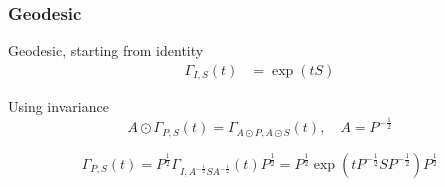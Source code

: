 \documentclass{beamer}
\begin{document}

\begin{frame}
\frametitle{Geodesic}

\begin{block}{Geodesic, starting from identity}
	\begin{align*}
			\Gamma_{I,S}(t) &= \exp(tS)
	\end{align*}
\end{block}

\begin{block}{ }
	Using invariance
	\begin{equation*}
	A \odot \Gamma_{P,S}(t) = \Gamma_{A \odot P ,A \odot S }(t) , \quad A = P^{-\frac12}
	\end{equation*}
	
	\begin{equation*}
	 \Gamma_{P,S}(t) = P^{\frac12} \Gamma_{I,A^{-\frac12}SA^{-\frac12}}(t) P^{\frac12}  = 
	  P^{\frac12} \exp( t P^{-\frac12}SP^{-\frac12} )P^{\frac12} 
	\end{equation*}
\end{block}
\end{frame}

\end{document}
